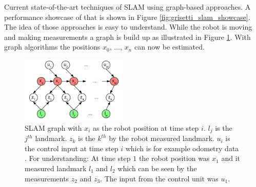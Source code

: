 Current state-of-the-art techniques of SLAM using graph-based approaches. A performance showcase of 
that is shown in Figure \ref{fig:grisetti_slam_showcase}. The idea of those approaches is easy to 
understand. While the robot is moving and making measurements a graph is build up as illustrated in 
Figure \ref{fig:kaess_slam_graph}. With graph algorithms the positions $x_0$, ..., $x_n$ can now be
estimated.

\begin{figure}[h!]
	\centering
	\includegraphics[width=0.45\textwidth]{images/kaess_slam_graph.png}
	\caption{
        SLAM graph with $x_i$ as the robot position at time step $i$. $l_j$ is the $j^{th}$ landmark. 
        $z_k$ is the $k^{th}$ by the robot measured landmark. $u_i$ is the control input at time step 
        $i$ which is for example odometry data \cite{kaess_isam:_2008}. For understanding: 
        At time step $1$ the robot position was $x_1$ and it measured landmark $l_1$ and $l_2$ 
        which can be seen by the measurements $z_2$ and $z_3$. The input from the control unit was $u_1$.
        }
	\label{fig:kaess_slam_graph}
\end{figure}
